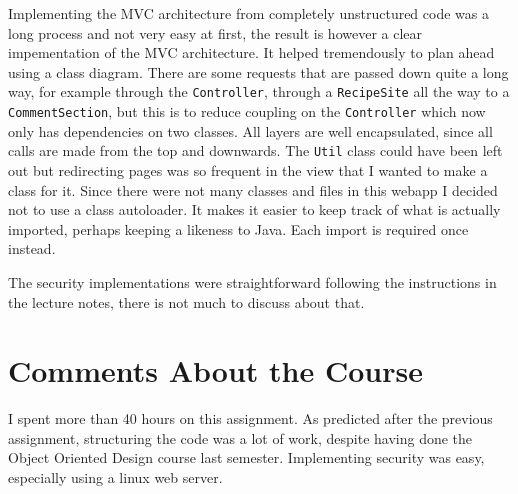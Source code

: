 \documentclass[a4paper]{scrreprt}
\newcommand{\code}[1]{\texttt{#1}}
\begin{document}
Implementing the MVC architecture from completely unstructured code was a long process and not very easy at first, the result is however a clear impementation of the MVC architecture. It helped tremendously to plan ahead using a class diagram. There are some requests that are passed down quite a long way, for example through the \code{Controller}, through a \code{RecipeSite} all the way to a \code{CommentSection}, but this is to reduce coupling on the \code{Controller} which now only has dependencies on two classes. All layers are well encapsulated, since all calls are made from the top and downwards. The \code{Util} class could have been left out but redirecting pages was so frequent in the view that I wanted to make a class for it. Since there were not many classes and files in this webapp I decided not to use a class autoloader. It makes it easier to keep track of what is actually imported, perhaps keeping a likeness to Java. Each import is required once instead.

The security implementations were straightforward following the instructions in the lecture notes, there is not much to discuss about that.

\chapter{Comments About the Course}

I spent more than 40 hours on this assignment.
As predicted after the previous assignment, structuring the code was a lot of work, despite having done the Object Oriented Design course last semester.
Implementing security was easy, especially using a linux web server.
\end{document}
